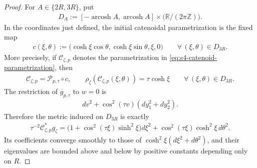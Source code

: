 \documentclass[a4paper,11pt,oneside,reqno]{amsart}
\numberwithin{equation}{section}
\theoremstyle{definition}
\begin{document}
\begin{proof}
    For $A\in\{2R,3R\}$, put
    \begin{align*}
        D_A:=[-\operatorname{arcosh}A,\operatorname{arcosh}A]
                  \times\bigl(\mathbb R/(2\pi\mathbb Z)\bigr).
    \end{align*}
    In the coordinates just defined, the initial catenoidal
    parametrization is the fixed map
    \begin{align*}
        c(\xi,\theta)
        :=\bigl(\cosh\xi\cos\theta,\cosh\xi\sin\theta,\xi,0\bigr)
        \qquad\forall\,(\xi,\theta)\in D_{3R}.
    \end{align*}
    More precisely, if $\mathcal C_{\zeta,p}$ denotes the
    parametrization in \eqref{eq:s4-catenoid-parametrization},
    then
    \begin{align*}
        \mathcal C_{\zeta,p}=\mathcal P_{p,\tau}\circ c,
        \qquad
        \rho_\zeta(\mathcal C_{\zeta,p}(\xi,\theta))
        =\tau\cosh\xi
        \qquad\forall\,(\xi,\theta)\in D_{3R}.
    \end{align*}
    The restriction of $\overline g_{p,\tau}$ to $w=0$
    is
    \begin{align*}
        dv^2+\cos^2(\tau v)(dy_1^2+dy_2^2).
    \end{align*}
    Therefore the metric induced on $D_{3R}$ is exactly
    \begin{align*}
        \tau^{-2}\mathcal C_{\zeta,p}^*g_\zeta
        =\bigl(1+\cos^2(\tau\xi)\sinh^2\xi\bigr)d\xi^2+\cos^2(\tau\xi)\cosh^2\xi\,d\theta^2.
    \end{align*}
    Its coefficients converge smoothly to those of
    $\cosh^2\xi(d\xi^2+d\theta^2)$, and their eigenvalues
    are bounded above and below by positive constants
    depending only on $R$.


\end{proof}
\end{document}
